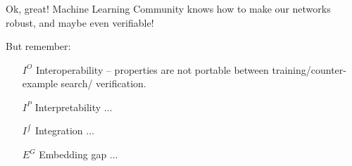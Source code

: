 \documentclass[aspectratio=169]{beamer}
\begin{document}
\begin{frame}
\frametitle{}

\begin{alertblock}{Ok, great!}
 Machine Learning Community knows how to make our networks robust, and maybe even verifiable!
\end{alertblock}
\pause
But remember: 

\begin{block}{}
\begin{itemize}
\item[$I^O$] \alert{Interoperability -- properties are not portable between training/counter-example search/ verification.}

\item[$I^{P}$] \alert{Interpretability} $\ldots$

\item[$I^{\int}$] Integration $\ldots$

\item[$E^G$] Embedding gap $\ldots$
\end{itemize}
\end{block}
\end{frame}
\end{document}
